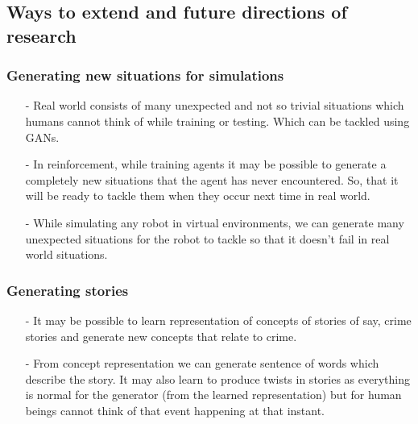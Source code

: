 \documentclass [11pt]{article}
\begin{document}
\vspace{0.5cm}
 
\subsection{Ways to extend and future directions of research}

\vspace{0.5cm}

\subsubsection{Generating new situations for simulations}
\begin{itemize}
    \item[-] Real world consists of many unexpected and not so trivial situations which humans cannot think of while training or testing. Which can be tackled using GANs. 
    \item[-] In reinforcement, while training agents it may be possible to generate a completely new situations that the agent has never encountered. So, that it will be ready to tackle them when they occur next time in real world.
    \item[-] While simulating any robot in virtual environments, we can generate many unexpected situations for the robot to tackle so that it doesn't fail in real world situations.  
\end{itemize}

\subsubsection{Generating stories}
\begin{itemize}
    \item[-] It may be possible to learn representation of concepts of stories of say, crime stories and generate new concepts that relate to crime.
    \item[-] From concept representation we can generate sentence of words which describe the story. It may also learn to produce twists in stories as everything is normal for the generator (from the learned representation) but for human beings cannot think of that event happening at that instant.
\end{itemize}
\end{document}
